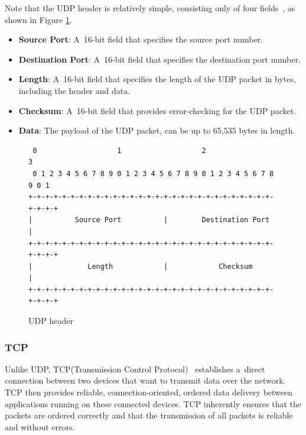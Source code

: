 \documentclass[
  printed,     %
  color,       %
  oneside,     %
  nosansbold,  %
  nocolorbold, %
  nolof,         %
  nolot,         %
]{fithesis4}
\begin{document}
Note that the UDP header is relatively simple, consisting only of four fields~\cite{RFC0768}, as shown in Figure \ref{fig:udp}.

\begin{itemize}[noitemsep,topsep=0pt]
    \item \textbf{Source Port}: A~16-bit field that specifies the source port number.
    \item \textbf{Destination Port}: A~16-bit field that specifies the destination port number.
    \item \textbf{Length}: A~16-bit field that specifies the length of the UDP packet in bytes, including the header and data.
    \item \textbf{Checksum}: A~16-bit field that provides error-checking for the UDP packet.
    \item \textbf{Data}: The payload of the UDP packet, can be up to 65,535 bytes in length.
\end{itemize}

\begin{figure}[h]
\fontsize{10pt}{10pt}\selectfont
\begin{center}
\begin{BVerbatim}
 0                   1                   2                   3  
 0 1 2 3 4 5 6 7 8 9 0 1 2 3 4 5 6 7 8 9 0 1 2 3 4 5 6 7 8 9 0 1
+-+-+-+-+-+-+-+-+-+-+-+-+-+-+-+-+-+-+-+-+-+-+-+-+-+-+-+-+-+-+-+-+
|          Source Port          |        Destination Port       |
+-+-+-+-+-+-+-+-+-+-+-+-+-+-+-+-+-+-+-+-+-+-+-+-+-+-+-+-+-+-+-+-+
|             Length            |            Checksum           |
+-+-+-+-+-+-+-+-+-+-+-+-+-+-+-+-+-+-+-+-+-+-+-+-+-+-+-+-+-+-+-+-+
\end{BVerbatim}
\end{center}
  \caption{UDP header~\cite{RFC0768}}
  \label{fig:udp}
\end{figure}

\subsubsection{TCP}
\label{chap:tcp}
Unlike UDP, TCP(Transmission Control Protocol)~\cite{RFC0793} establishes a~direct connection between two devices that want to transmit data over the network. TCP then provides reliable, connection-oriented, ordered data delivery between applications running on these connected devices. TCP inherently ensures that the packets are ordered correctly and that the transmission of all packets is reliable and without errors.
\end{document}
